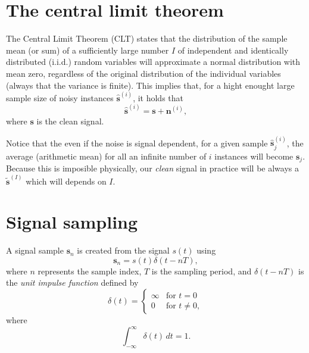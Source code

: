 \documentclass{article}
\begin{document}

\section{The central limit theorem}
\label{sec:CLT}

The Central Limit Theorem (CLT) states that the distribution of the
sample mean (or sum) of a sufficiently large number $I$ of independent
and identically distributed (i.i.d.) random variables will approximate
a normal distribution with mean zero, regardless of the original
distribution of the individual variables \cite{kendall1968advanced}
(always that the variance is finite). This implies that, for a hight
enought large sample size of noisy instances $\hat{\mathbf{s}}^{(i)}$,
it holds that
\begin{equation}
  \hat{\mathbf{s}}^{(i)} = \mathbf{s} + \mathbf{n}^{(i)},
\end{equation}
where $\mathbf{s}$ is the clean signal.

Notice that the even if the noise is signal dependent, for a given
sample $\hat{\mathbf{s}}^{(i)}_j$, the average (arithmetic mean) for
all an infinite number of $i$ instances will become
$\mathbf{s}_j$. Because this is imposible physically, our \emph{clean}
signal in practice will be always a $\tilde{\mathbf{s}}^{(I)}$ which
will depends on $I$.



\section{Signal sampling}

A signal sample $\mathbf{s}_n$ is created from the signal $s(t)$ using
\begin{equation}
  \mathbf{s}_n = s(t)\delta(t-nT),
\end{equation}
where $n$ represents the sample index, $T$ is the sampling period, and
$\delta(t-nT)$ is the \emph{unit impulse function} defined by
\begin{equation}
\delta(t) =
\begin{cases}
\infty & \text{for } t = 0 \\
0 & \text{for } t \neq 0,
\end{cases}
\end{equation}
where
\begin{equation}
\int_{-\infty}^{\infty} \delta(t) \, dt = 1.
\end{equation}
\end{document}
